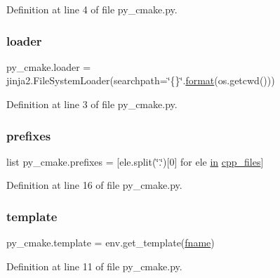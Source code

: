 Definition at line 4 of file py\+\_\+cmake.\+py.

\mbox{\label{namespacepy__cmake_a84a25d33eb535db93c795c9b431ad3e4}} 
\subsubsection{\texorpdfstring{loader}{loader}}
{\footnotesize\ttfamily py\+\_\+cmake.\+loader = jinja2.\+File\+System\+Loader(searchpath=\char`\"{}\{\}\char`\"{}.\mbox{\hyperlink{glad_8h_ae2d3db041c6004a67047659b42f73a44}{format}}(os.\+getcwd()))}



Definition at line 3 of file py\+\_\+cmake.\+py.

\mbox{\label{namespacepy__cmake_a59f5470f82dcb720da6c7a7c2d366a4f}} 
\subsubsection{\texorpdfstring{prefixes}{prefixes}}
{\footnotesize\ttfamily list py\+\_\+cmake.\+prefixes = \mbox{[}ele.\+split(\char`\"{}.\char`\"{})\mbox{[}0\mbox{]} for ele \mbox{\hyperlink{glad_8h_a83ad0ee7f1e06b59c90271716e689080}{in}} \mbox{\hyperlink{namespacepy__cmake_a2adfb240dd9e470e11d95645a68c30e9}{cpp\+\_\+files}}\mbox{]}}



Definition at line 16 of file py\+\_\+cmake.\+py.

\mbox{\label{namespacepy__cmake_a5931934f67619e9c0e91f7eb4180f5f0}} 
\subsubsection{\texorpdfstring{template}{template}}
{\footnotesize\ttfamily py\+\_\+cmake.\+template = env.\+get\+\_\+template(\mbox{\hyperlink{namespacepy__cmake_a384351d048ae243fa2f2f419db26f3ad}{fname}})}



Definition at line 11 of file py\+\_\+cmake.\+py.

